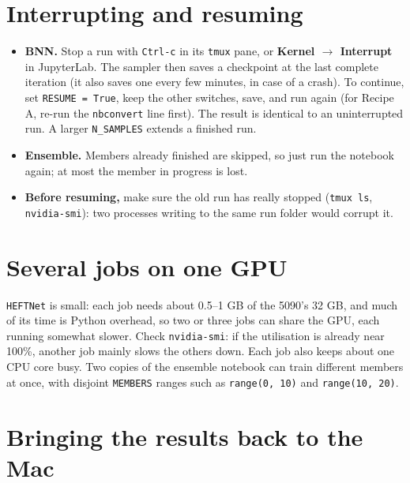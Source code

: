 \documentclass[11pt]{article}
\newcommand{\code}[1]{\texttt{#1}}
\begin{document}
\section{Interrupting and resuming}

\begin{itemize}
  \item \textbf{BNN.} Stop a run with \code{Ctrl-c} in its \code{tmux} pane, or
    \textbf{Kernel $\to$ Interrupt} in JupyterLab. The sampler then saves a checkpoint at
    the last complete iteration (it also saves one every few minutes, in case of a crash).
    To continue, set \code{RESUME = True}, keep the other switches, save, and run again
    (for Recipe A, re-run the \code{nbconvert} line first). The result is identical to an
    uninterrupted run. A larger \code{N\_SAMPLES} extends a finished run.
  \item \textbf{Ensemble.} Members already finished are skipped, so just run the notebook
    again; at most the member in progress is lost.
  \item \textbf{Before resuming,} make sure the old run has really stopped (\code{tmux ls},
    \code{nvidia-smi}): two processes writing to the same run folder would corrupt it.
\end{itemize}

\section{Several jobs on one GPU}

\code{HEFTNet} is small: each job needs about 0.5--1 GB of the 5090's 32 GB, and much of its
time is Python overhead, so two or three jobs can share the GPU, each running somewhat
slower. Check \code{nvidia-smi}: if the utilisation is already near 100\%, another job
mainly slows the others down. Each job also keeps about one CPU core busy. Two copies of
the ensemble notebook can train different members at once, with disjoint
\code{MEMBERS} ranges such as \code{range(0, 10)} and \code{range(10, 20)}.

\section{Bringing the results back to the Mac}
\end{document}
